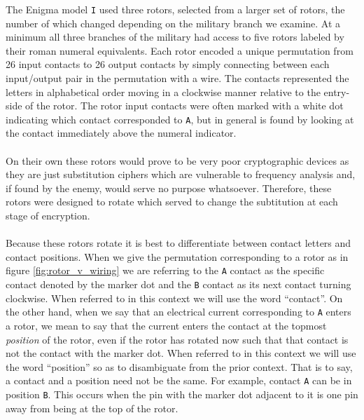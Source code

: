 The Enigma model \texttt{I} used three rotors, selected from a larger
set of rotors, the number of which changed depending on the military
branch we examine. At a minimum all three branches of the military
had access to five rotors labeled by their roman numeral equivalents.
Each rotor encoded a unique permutation from 26 input contacts to 26
output contacts by simply connecting between each input/output pair
in the permutation with a wire. The contacts represented the letters
in alphabetical order moving in a clockwise manner relative to the
entry-side of the rotor. The rotor input contacts were often marked
with a white dot indicating which contact corresponded to \texttt{A},
but in general is found by looking at the contact immediately above
the numeral indicator.
\\\\On their own these rotors would prove to be very poor
cryptographic devices as they are just substitution ciphers which are
vulnerable to frequency analysis and, if found by the enemy, would
serve no purpose whatsoever. Therefore, these rotors were designed to
rotate which served to change the subtitution at each stage of encryption.
\\\\Because these rotors rotate it is best to differentiate between
contact letters and contact positions. When we give the permutation
corresponding to a rotor as in figure \ref{fig:rotor_v_wiring} we are
referring to the \texttt{A} contact as the specific contact denoted
by the marker dot and the \texttt{B} contact as its next contact
turning clockwise. When referred to in this context we will use the
word ``contact''. On the other hand, when we say that an electrical
current corresponding to \texttt{A} enters a rotor, we mean to say
that the current enters the contact at the topmost \emph{position} of
the rotor, even if the rotor has rotated now such that that contact
is not the contact with the marker dot. When referred to in this
context we will use the word ``position'' so as to disambiguate from
the prior context. That is to say, a contact and a position need not
be the same. For example, contact \texttt{A} can be in position
\texttt{B}. This occurs when the pin with the marker dot adjacent to
it is one pin away from being at the top of the rotor.

